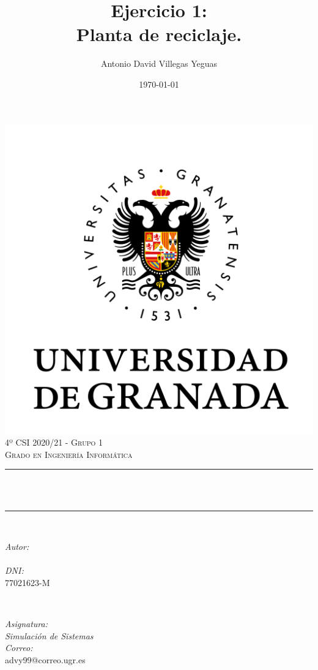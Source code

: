 \documentclass[12pt, spanish]{article}
\title{Ejercicio 1:\\
Planta de reciclaje.\hspace{0.05cm} }
\author{Antonio David Villegas Yeguas}
\date{\today}
\makeatletter
\let\thetitle\@title
\let\theauthor\@author
\makeatother
\begin{document}

\begin{titlepage}
    \centering
    \vspace*{0.3 cm}
    \includegraphics[scale = 0.50]{ugr.png}\\[0.7 cm]
    \textsc{\large 4º CSI 2020/21 - Grupo 1}\\[0.5 cm]
    \textsc{\large Grado en Ingeniería Informática}\\[0.5 cm]
    \rule{\linewidth}{0.2 mm} \\[0.2 cm]
    { \huge \bfseries \thetitle}\\
    \rule{\linewidth}{0.2 mm} \\[1 cm]

    \begin{minipage}{0.4\textwidth}
        \begin{flushleft} \large
            \emph{Autor:}\\
            \theauthor\\
			 \emph{DNI:}\\
            77021623-M
            \end{flushleft}
            \end{minipage}~
            \begin{minipage}{0.4\textwidth}
            \begin{flushright} \large
            \emph{Asignatura: \\
            Simulación de Sistemas}   \\
            \emph{Correo:}\\
            advy99@correo.ugr.es
        \end{flushright}
    \end{minipage}\\[0.5cm]


\end{titlepage}
\end{document}
